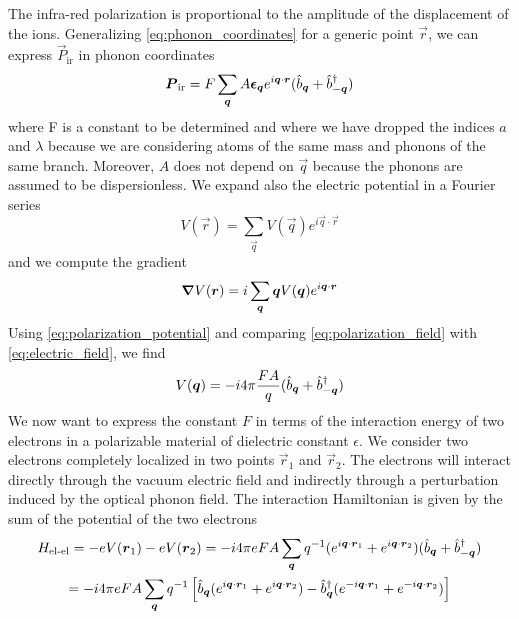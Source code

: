 The infra-red polarization is proportional to the amplitude of the displacement of the ions. Generalizing \cref{eq:phonon_coordinates} for a generic point $\vec{r}$, we can express $\vec{P}_\text{ir}$ in phonon coordinates
\begin{equation} \label{eq:polarization_field}
    \mathbf{\boldsymbol{P}}_\text{ir} = F  \sum_{\mathbf{\boldsymbol{q}}} A \mathbf{\boldsymbol{\epsilon}}_{\mathbf{\boldsymbol{q}}} e^{i\mathbf{\boldsymbol{q}} \cdot \mathbf{\boldsymbol{r}}} (\hat{b}_{\mathbf{\boldsymbol{q}}} + \hat{b}^\dagger_{-\mathbf{\boldsymbol{q}}})
\end{equation}
where F is a constant to be determined and where we have dropped the indices $a$ and $\lambda$ because we are considering atoms of the same mass and phonons of the same branch. Moreover, $A$ does not depend on $\vec{q}$ because the phonons are assumed to be dispersionless. We expand also the electric potential in a Fourier series
\begin{equation}
    V(\vec{r}) = \sum_\vec{q} V(\vec{q}) e^{i\vec{q} \cdot \vec{r}}
\end{equation}
and we compute the gradient
\begin{equation} \label{eq:electric_field}
    \grad V(\mathbf{\boldsymbol{r}}) = i \sum_{\mathbf{\boldsymbol{q}}} \mathbf{\boldsymbol{q}} V(\mathbf{\boldsymbol{q}}) e^{i\mathbf{\boldsymbol{q}} \cdot \mathbf{\boldsymbol{r}}}
\end{equation}
Using \cref{eq:polarization_potential} and comparing \cref{eq:polarization_field} with \cref{eq:electric_field}, we find
\begin{equation}
    V(\mathbf{\boldsymbol{q}}) = -i4\pi \frac{F A}{q} (\hat{b}_{\mathbf{\boldsymbol{q}}} + \hat{b}^\dagger_{-\mathbf{\boldsymbol{q}}})
\end{equation}
We now want to express the constant $F$ in terms of the interaction energy of two electrons in a polarizable material of dielectric constant $\epsilon$. We consider two electrons completely localized in two points $\vec{r}_1$ and $\vec{r}_2$. The electrons will interact directly through the vacuum electric field and indirectly through a perturbation induced by the optical phonon field. The interaction Hamiltonian is given by the sum of the potential of the two electrons
\begin{multline} \label{eq:hamiltonian_coulomb_medium}
    H_\text{el-el} = -e V(\mathbf{\boldsymbol{r}}_1) -e V(\mathbf{\boldsymbol{r}}_2)
    = -i 4\pi e F A \sum_{\mathbf{\boldsymbol{q}}} q^{-1} (e^{i\mathbf{\boldsymbol{q}} \cdot \mathbf{\boldsymbol{r}}_1} + e^{i\mathbf{\boldsymbol{q}} \cdot \mathbf{\boldsymbol{r}}_2} ) (\hat{b}_{\mathbf{\boldsymbol{q}}} + \hat{b}^\dagger_{-\mathbf{\boldsymbol{q}}})
    \\ = -i 4\pi e F A \sum_{\mathbf{\boldsymbol{q}}} q^{-1} \left[ \hat{b}_{\mathbf{\boldsymbol{q}}} (e^{i\mathbf{\boldsymbol{q}} \cdot \mathbf{\boldsymbol{r}}_1} + e^{i\mathbf{\boldsymbol{q}} \cdot \mathbf{\boldsymbol{r}}_2} )   - \hat{b}^\dagger_{\mathbf{\boldsymbol{q}}} (e^{-i\mathbf{\boldsymbol{q}} \cdot \mathbf{\boldsymbol{r}}_1} + e^{-i\mathbf{\boldsymbol{q}} \cdot \mathbf{\boldsymbol{r}}_2} )\right]
\end{multline}

